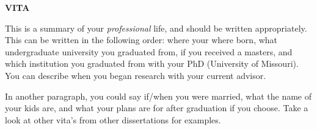 \newpage
{}

\centerline{\bf \large VITA}
\vspace{10mm} %
This is a summary of your \textit{professional} life, and should be written
appropriately.  This can be written in the following order:  where your where
born, what undergraduate university you graduated from, if you received a
masters, and which institution you graduated from with your PhD (University of
Missouri).  You can describe when you began research with your current advisor.

In another paragraph, you could say if/when you were married, what the
name of your kids are, and what your plans are for after graduation if you
choose.  Take a look at other vita's from other dissertations for examples.
